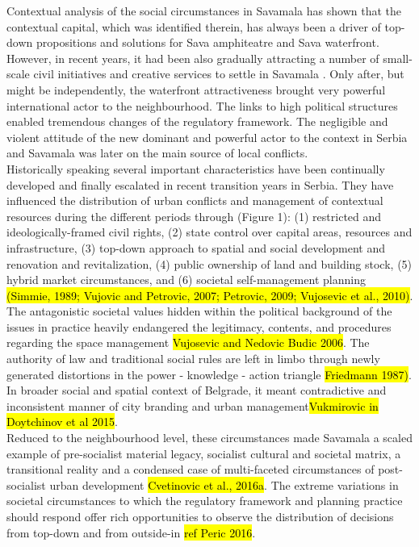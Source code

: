 \documentclass[11pt]{report}
\begin{document}
Contextual analysis of the social circumstances in Savamala has shown that the contextual capital, which was identified therein, has always been a driver of top-down propositions and solutions for Sava amphiteatre and Sava waterfront.
However, in recent years, it had been also  gradually attracting a number of small-scale civil initiatives and creative services to settle in Savamala \cite{Cvetinovic et al., 2013}.
Only after, but might be independently, the waterfront attractiveness brought very powerful international actor to the neighbourhood.
The links to high political structures enabled tremendous changes of the regulatory framework.
The negligible and violent attitude of the new dominant and powerful actor to the context in Serbia and Savamala was later on the main source of local conflicts. 
\\
Historically speaking several important characteristics have been continually developed and finally escalated in recent transition years in Serbia. They have influenced the distribution of urban conflicts and management of contextual resources during the different periods through (Figure 1): 
(1) restricted and ideologically-framed civil rights, 
(2) state control over capital areas, resources and infrastructure, 
(3) top-down approach to spatial and social development and renovation and revitalization, 
(4) public ownership of land and building stock, 
(5) hybrid market circumstances, and  
(6) societal self-management planning \hl{(Simmie, 1989; Vujovic and Petrovic, 2007; Petrovic, 2009; Vujosevic et al., 2010)}.
The antagonistic societal values hidden within the political background of the issues in practice heavily endangered the legitimacy, contents, and procedures regarding the space management \hl{Vujosevic and Nedovic Budic 2006}.
The authority of law and traditional social rules are left in limbo through newly generated distortions in the power - knowledge - action triangle \hl{Friedmann 1987)}.
In broader social and spatial context of Belgrade, it meant contradictive and inconsistent manner of city branding and urban management\hl{Vukmirovic in Doytchinov et al 2015}.
\\
Reduced to the neighbourhood level, these circumstances made Savamala a scaled example of pre-socialist material legacy, socialist cultural and societal matrix, a transitional reality and a condensed case of multi-faceted circumstances of post-socialist urban development \hl{Cvetinovic et al., 2016a}.
The extreme variations in societal circumstances to which the regulatory framework and planning practice should respond offer rich opportunities to observe the distribution of decisions from top-down and from outside-in \hl{ref Peric 2016}.
\end{document}
